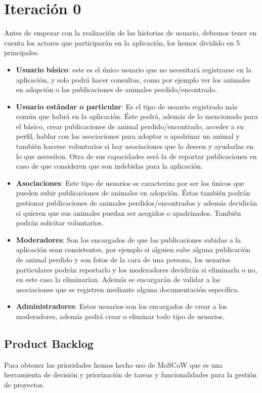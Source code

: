 \section{Iteración 0}
Antes de empezar con la realización de las historias de usuario, debemos tener en cuenta los actores que participarán en la aplicación, los hemos dividido en 5 principales.
\begin{itemize}
	\item \textbf{Usuario básico}: este es el único usuario que no necesitará registrarse en la aplicación, y solo podrá hacer consultas, como por ejemplo ver los animales en adopción o las publicaciones de animales perdido/encontrado.
	\item \textbf{Usuario estándar o particular}: Es el tipo de usuario registrado más común que habrá en la aplicación. Éste podrá, además de lo mencionado para el básico, crear publicaciones de animal perdido/encontrado, acceder a su perfil, hablar con las asociaciones para adoptar o apadrinar un animal y también hacerse voluntarios si hay asociaciones que lo deseen y ayudarlas en lo que necesiten. Otra de sus capacidades será la de reportar publicaciones en caso de que consideren que son indebidas para la aplicación.
	\item \textbf{Asociaciones}: Este tipo de usuarios se caracteriza por ser los únicos que pueden subir publicaciones de animales en adopción. Éstas también podrán gestionar publicaciones de animales perdidos/encontrados y además decidirán si quieren que sus animales puedan ser acogidos o apadrinados. También podrán solicitar voluntarios.
	\item \textbf{Moderadores}: Son los encargados de que las publicaciones subidas a la aplicación sean consistentes, por ejemplo si alguien sube alguna publicación de animal perdido y son fotos de la cara de una persona, los usuarios particulares podrán reportarlo y los moderadores decidirán si eliminarla o no, en este caso la eliminarían. Además se encargarán de validar a las asociaciones que se registren mediante alguna documentación específica.
	\item \textbf{Administradores}: Estos usuarios son los encargados de crear a los moderadores, además podrá crear o eliminar todo tipo de usuarios.
	
\end{itemize}
\subsection{Product Backlog}
Para obtener las prioridades hemos hecho uso de MoSCoW \cite{moscow} que es una herramienta de decisión y priorización de tareas y funcionalidades para la gestión de proyectos.

